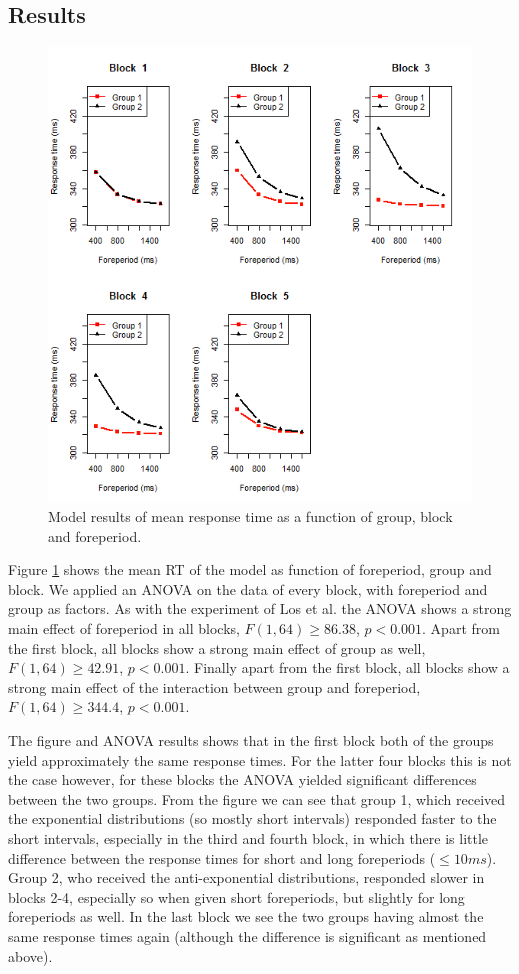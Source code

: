 \documentclass[10pt,letterpaper]{article}
\begin{document}
\subsection{Results}
\begin{figure}
	\centering
	\includegraphics[width=\columnwidth]{5blocks2.png}
	\caption{Model results of mean response time as a function of group, block and foreperiod.}
	\label{5blocks}
\end{figure}
Figure \ref{5blocks} shows the mean RT of the model as function of foreperiod, group and block. We applied an ANOVA on the data of every block, with foreperiod and group as factors. As with the experiment of Los et al. the ANOVA shows a strong main effect of foreperiod in all blocks, $F(1,64) \geq 86.38$, $p < 0.001$. Apart from the first block, all blocks show a strong main effect of group as well, $F(1,64) \geq 42.91$, $p < 0.001$. Finally apart from the first block, all blocks show a strong main effect of the interaction between group and foreperiod, $F(1,64) \geq 344.4$, $p < 0.001$.

The figure and ANOVA results shows that in the first block both of the groups yield approximately the same response times. For the latter four blocks this is not the case however, for these blocks the ANOVA yielded significant differences between the two groups. From the figure we can see that group 1, which received the exponential distributions (so mostly short intervals) responded faster to the short intervals, especially in the third and fourth block, in which there is little difference between the response times for short and long foreperiods ($\leq 10 ms$). Group 2, who received the anti-exponential distributions, responded slower in blocks 2-4, especially so when given short foreperiods, but slightly for long foreperiods as well. In the last block we see the two groups having almost the same response times again (although the difference is significant as mentioned above).
\end{document}
